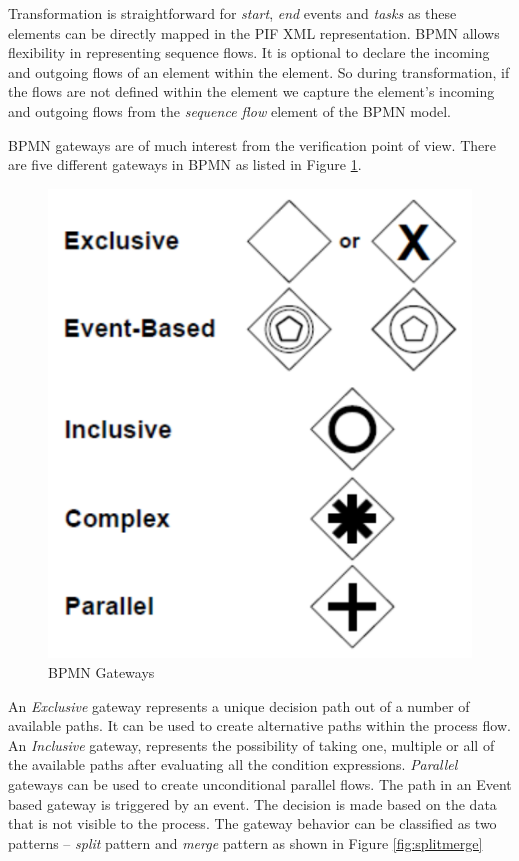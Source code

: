 \documentclass{article}
\begin{document}
Transformation is straightforward for \textit{start}, \textit{end} events and \textit{tasks} as these elements can be directly mapped in the PIF XML representation. 
BPMN allows flexibility in representing sequence flows. It is optional to declare the incoming and outgoing flows of an element within the element. So during transformation, if the flows are not defined within the element we capture the element’s incoming and outgoing flows from the \textit{sequence flow} element of the BPMN model.

BPMN gateways are of much interest from the verification point of view. There are five different gateways in BPMN as listed in Figure \ref{fig:gateways}.

\begin{figure}[h]
\center
\includegraphics[scale =0.8]{Gateway.png}
\caption{BPMN Gateways}
\label{fig:gateways}
\end{figure}

An \textit{Exclusive} gateway represents a unique decision path out of a number of available paths. It can be used to create alternative paths within the process flow. An \textit{Inclusive} gateway, represents the possibility of taking one, multiple or all of the available paths after evaluating all the condition expressions. \textit{Parallel} gateways can be used to create unconditional parallel flows. The path in an Event based gateway is triggered by an event. The decision is made based on the data that is not visible to the process. The gateway behavior can be classified as two patterns – \textit{split} pattern and \textit{merge} pattern as shown in Figure \ref{fig:splitmerge}
\end{document}

